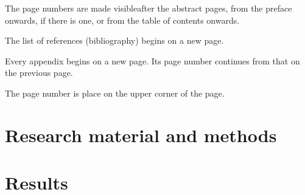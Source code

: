 The page numbers are made visibleafter the abstract pages, from the preface 
onwards, if there is one, or from the table of contents onwards.

The list of references (bibliography) begins on a new page.

Every appendix begins on a new page. Its page number continues from that on the
previous page.

The page number is place on the upper corner of the page.




\clearpage

\section{Research material and methods}


\clearpage

\section{Results}



